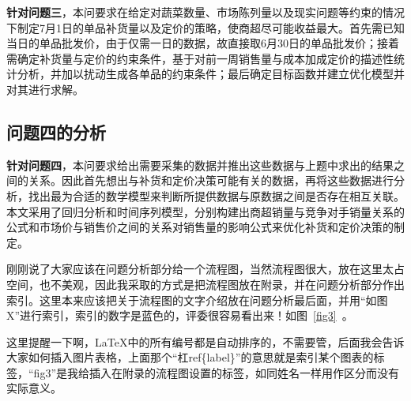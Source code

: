 \textbf{针对问题三}，本问要求在给定对蔬菜数量、市场陈列量以及现实问题等约束的情况下制定7月1日的单品补货量以及定价的策略，使商超尽可能收益最大。首先需已知当日的单品批发价，由于仅需一日的数据，故直接取6月30日的单品批发价；接着需确定补货量与定价的约束条件，基于对前一周销售量与成本加成定价的描述性统计分析，并加以扰动生成各单品的约束条件；最后确定目标函数并建立优化模型并对其进行求解。


\subsection{问题四的分析}


\textbf{针对问题四}，本问要求给出需要采集的数据并推出这些数据与上题中求出的结果之间的关系。因此首先想出与补货和定价决策可能有关的数据，再将这些数据进行分析，找出最为合适的数学模型来判断所提供数据与原数据之间是否存在相互关联。本文采用了回归分析和时间序列模型，分别构建出商超销量与竞争对手销量关系的公式和市场价与销售价之间的关系对销售量的影响公式来优化补货和定价决策的制定。


刚刚说了大家应该在问题分析部分给一个流程图，当然流程图很大，放在这里太占空间，也不美观，因此我采取的方式是把流程图放在附录，并在问题分析部分作出索引。这里本来应该把关于流程图的文字介绍放在问题分析最后面，并用“如图X”进行索引，索引的数字是蓝色的，评委很容易看出来！如图~\ref{fig3}~。

这里提醒一下啊，\LaTeX 中的所有编号都是自动排序的，不需要管，后面我会告诉大家如何插入图片表格，上面那个“杠ref\{label\}”的意思就是索引某个图表的标签，“fig3”是我给插入在附录的流程图设置的标签，如同姓名一样用作区分而没有实际意义。
























